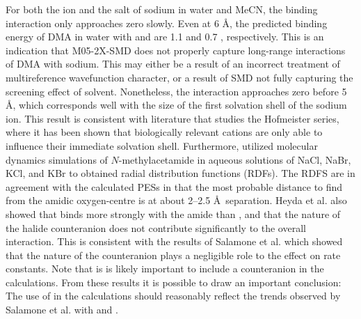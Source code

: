 For both the ion and the salt of sodium in water and MeCN, the binding
interaction only approaches zero slowly. Even at 6 \AA, the predicted binding
energy of DMA in water with  and  are 1.1 and 0.7 \kcalmol,
respectively. This is an indication that M05-2X-SMD does not properly capture
long-range interactions of DMA with sodium. This may either be a result of an
incorrect treatment of multireference wavefunction character, or a result of SMD
not fully capturing the screening effect of solvent. Nonetheless, the
interaction approaches zero before 5 \AA, which corresponds well with the size
of the first solvation shell of the sodium ion.\cite{Degreve1996} This result is
consistent with literature that studies the Hofmeister series, where it has been
shown that biologically relevant cations are only able to influence their
immediate solvation shell.\cite{Omta2003, Funkner2011} Furthermore,
\citet{Heyda2009} utilized molecular dynamics simulations of $N$-methylacetamide
in aqueous solutions of NaCl, NaBr, KCl, and KBr to obtained radial distribution
functions (RDFs). The RDFS are in agreement with the calculated PESs in that the
most probable distance to find  from the amidic oxygen-centre is at
about 2--2.5 \AA\ separation. Heyda et al. also showed that  binds more
strongly with the amide than , and that the nature of the halide
counteranion does not contribute significantly to the overall interaction. This
is consistent with the results of Salamone et al. which showed that the nature
of the counteranion plays a negligible role to the effect on rate
constants.\cite{Salamone2013a} Note that is is likely important to include a
counteranion in the calculations. From these results it is possible to draw an
important conclusion: The use of  in the calculations should reasonably
reflect the trends observed by Salamone et al.  with  and .

